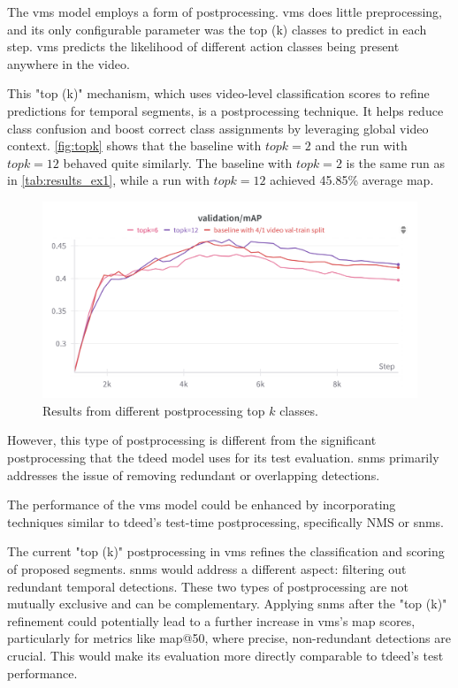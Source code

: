 The \acrshort{vms} model employs a form of postprocessing. \acrshort{vms} does little preprocessing, and its only configurable parameter was the top (k) classes to predict in each step. \acrshort{vms} predicts the likelihood of different action classes being present anywhere in the video. 

This "top (k)" mechanism, which uses video-level classification scores to refine predictions for temporal segments, is a postprocessing technique. It helps reduce class confusion and boost correct class assignments by leveraging global video context. \autoref{fig:topk} shows that the baseline with \(topk=2\) and the run with \(topk=12\) behaved quite similarly. The baseline with \(topk=2\) is the same run as in \autoref{tab:results_ex1}, while a run with \(topk=12\) achieved 45.85\% average \acrshort{map}.

\begin{figure}
    \centering
    \includegraphics[width=\linewidth]{figures/topk_classes.png}
    \caption{Results from different postprocessing top \(k\) classes.}
    \label{fig:topk}
\end{figure}

However, this type of postprocessing is different from the significant postprocessing that the \acrshort{tdeed} model uses for its test evaluation. \acrshort{snms} primarily addresses the issue of removing redundant or overlapping detections.

The performance of the \acrshort{vms} model could be enhanced by incorporating techniques similar to \acrshort{tdeed}'s test-time postprocessing, specifically NMS or \acrshort{snms}.

The current "top (k)" postprocessing in \acrshort{vms} refines the classification and scoring of proposed segments.
\acrshort{snms} would address a different aspect: filtering out redundant temporal detections.
These two types of postprocessing are not mutually exclusive and can be complementary. Applying \acrshort{snms} after the "top (k)" refinement could potentially lead to a further increase in \acrshort{vms}'s \acrshort{map} scores, particularly for metrics like \acrshort{map}@50, where precise, non-redundant detections are crucial. This would make its evaluation more directly comparable to \acrshort{tdeed}'s test performance.


